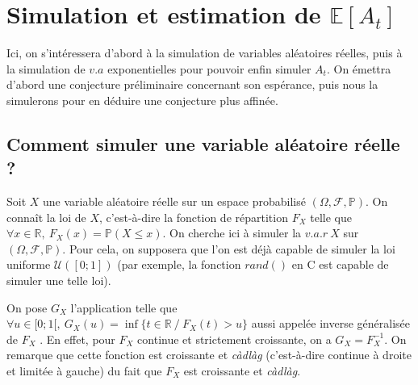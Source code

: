 \documentclass[a4paper, titlepage]{livret} %
\begin{document}
	\chapter{Simulation et estimation de $\mathbb{E}[A_{t}]$}
		Ici, on s'intéressera d'abord à la simulation de variables aléatoires réelles, puis à la simulation de $v.a$ exponentielles pour pouvoir enfin simuler $A_{t}$.
		On émettra d'abord une conjecture préliminaire concernant son espérance, puis nous la simulerons pour en déduire une conjecture plus affinée.

		\section{Comment simuler une variable aléatoire réelle ?}
			Soit $X$ une variable aléatoire réelle sur un espace probabilisé $(\Omega, \mathcal{F}, \mathbb{P})$.
			On connaît la loi de $X$, c'est-à-dire la fonction de répartition $F_{X}$ telle que $\forall x \in \mathbb{R}, \ F_{X}(x) = \mathbb{P}(X \leq x)$.
			On cherche ici à simuler la $v.a.r \ X$ sur $(\Omega, \mathcal{F}, \mathbb{P})$.
			Pour cela, on supposera que l'on est déjà capable de simuler la loi uniforme $\mathcal{U}([0;1])$ (par exemple, la fonction $rand()$ en C est capable de simuler une telle loi).

			On pose $G_{X}$ l'application telle que $\forall u \in [0;1[, \ G_{X}(u) = \inf{\{t \in \mathbb{R} \ / \ F_{X}(t) > u\}}$ aussi appelée \og inverse généralisée de $F_{X}$ \fg.
			En effet, pour $F_{X}$ continue et strictement croissante, on a $G_{X} = F_{X}^{-1}$.
			On remarque que cette fonction est croissante et \textit{càdlàg} (c'est-à-dire continue à droite et limitée à gauche) du fait que $F_{X}$ est croissante et \textit{càdlàg}.
\end{document}
